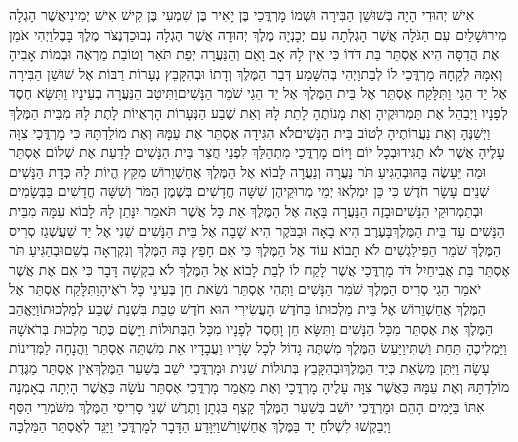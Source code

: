 \documentclass[../main/main.tex]{subfiles}
\begin{document}
\begin{multicols*}{\ncols}
אִישׁ יְהוּדִי הָיָה בְּשׁוּשַׁן הַבִּירָה וּשְׁמוֹ מָרְדֳּכַי בֶּן יָאִיר בֶּן שִׁמְעִי בֶּן קִישׁ אִישׁ יְמִינִי\PreVerseSpace{}אֲשֶׁר הָגְלָה מִירוּשָׁלַיִם עִם הַגֹּלָה אֲשֶׁר הָגְלְתָה עִם יְכָנְיָה מֶלֶךְ יְהוּדָה אֲשֶׁר הֶגְלָה נְבוּכַדְנֶצֹּר מֶלֶךְ בָּבֶל\PreVerseSpace{}וַיְהִי אֹמֵן אֶת הֲדַסָּה הִיא אֶסְתֵּר בַּת דֹּדוֹ כִּי אֵין לָהּ אָב וָאֵם וְהַנַּעֲרָה יְפַת תֹּאַר וְטוֹבַת מַרְאֶה וּבְמוֹת אָבִיהָ וְאִמָּהּ לְקָחָהּ מָרְדֳּכַי לוֹ לְבַת\PreVerseSpace{}וַיְהִי בְּהִשָּׁמַע דְּבַר הַמֶּלֶךְ וְדָתוֹ וּבְהִקָּבֵץ נְעָרוֹת רַבּוֹת אֶל שׁוּשַׁן הַבִּירָה אֶל יַד הֵגָי וַתִּלָּקַח אֶסְתֵּר אֶל בֵּית הַמֶּלֶךְ אֶל יַד הֵגַי שֹׁמֵר הַנָּשִׁים\PreVerseSpace{}וַתִּיטַב הַנַּעֲרָה בְעֵינָיו וַתִּשָּׂא חֶסֶד לְפָנָיו וַיְבַהֵל אֶת תַּמְרוּקֶיהָ וְאֶת מָנוֹתֶהָ לָתֵת לָהּ וְאֵת שֶׁבַע הַנְּעָרוֹת הָרְאֻיוֹת לָתֶת לָהּ מִבֵּית הַמֶּלֶךְ וַיְשַׁנֶּהָ וְאֶת נַעֲרוֹתֶיהָ לְטוֹב בֵּית הַנָּשִׁים\PreVerseSpace{}לֹא הִגִּידָה אֶסְתֵּר אֶת עַמָּהּ וְאֶת מוֹלַדְתָּהּ כִּי מָרְדֳּכַי צִוָּה עָלֶיהָ אֲשֶׁר לֹא תַגִּיד\PreVerseSpace{}וּבְכָל יוֹם וָיוֹם מָרְדֳּכַי מִתְהַלֵּךְ לִפְנֵי חֲצַר בֵּית הַנָּשִׁים לָדַעַת אֶת שְׁלוֹם אֶסְתֵּר וּמַה יֵּעָשֶׂה בָּהּ\PreVerseSpace{}וּבְהַגִּיעַ תֹּר נַעֲרָה וְנַעֲרָה לָבוֹא אֶל הַמֶּלֶךְ אֲחַשְׁוֵרוֹשׁ מִקֵּץ הֱיוֹת לָהּ כְּדָת הַנָּשִׁים שְׁנֵים עָשָׂר חֹדֶשׁ כִּי כֵּן יִמְלְאוּ יְמֵי מְרוּקֵיהֶן שִׁשָּׁה חֳדָשִׁים בְּשֶׁמֶן הַמֹּר וְשִׁשָּׁה חֳדָשִׁים בַּבְּשָׂמִים וּבְתַמְרוּקֵי הַנָּשִׁים\PreVerseSpace{}וּבָזֶה הַנַּעֲרָה בָּאָה אֶל הַמֶּלֶךְ אֵת כָּל אֲשֶׁר תֹּאמַר יִנָּתֵן לָהּ לָבוֹא עִמָּהּ מִבֵּית הַנָּשִׁים עַד בֵּית הַמֶּלֶךְ\PreVerseSpace{}בָּעֶרֶב הִיא בָאָה וּבַבֹּקֶר הִיא שָׁבָה אֶל בֵּית הַנָּשִׁים שֵׁנִי אֶל יַד שַׁעֲשְׁגַז סְרִיס הַמֶּלֶךְ שֹׁמֵר הַפִּילַגְשִׁים לֹא תָבוֹא עוֹד אֶל הַמֶּלֶךְ כִּי אִם חָפֵץ בָּהּ הַמֶּלֶךְ וְנִקְרְאָה בְשֵׁם\PreVerseSpace{}וּבְהַגִּיעַ תֹּר אֶסְתֵּר בַּת אֲבִיחַיִל דֹּד מָרְדֳּכַי אֲשֶׁר לָקַח לוֹ לְבַת לָבוֹא אֶל הַמֶּלֶךְ לֹא בִקְשָׁה דָּבָר כִּי אִם אֶת אֲשֶׁר יֹאמַר הֵגַי סְרִיס הַמֶּלֶךְ שֹׁמֵר הַנָּשִׁים וַתְּהִי אֶסְתֵּר נֹשֵׂאת חֵן בְּעֵינֵי כָּל רֹאֶיהָ\PreVerseSpace{}וַתִּלָּקַח אֶסְתֵּר אֶל הַמֶּלֶךְ אֲחַשְׁוֵרוֹשׁ אֶל בֵּית מַלְכוּתוֹ בַּחֹדֶשׁ הָעֲשִׂירִי הוּא חֹדֶשׁ טֵבֵת בִּשְׁנַת שֶׁבַע לְמַלְכוּתוֹ\PreVerseSpace{}וַיֶּאֱהַב הַמֶּלֶךְ אֶת אֶסְתֵּר מִכָּל הַנָּשִׁים וַתִּשָּׂא חֵן וָחֶסֶד לְפָנָיו מִכָּל הַבְּתוּלוֹת וַיָּשֶׂם כֶּתֶר מַלְכוּת בְּרֹאשָׁהּ וַיַּמְלִיכֶהָ תַּחַת וַשְׁתִּי\PreVerseSpace{}וַיַּעַשׂ הַמֶּלֶךְ מִשְׁתֶּה גָדוֹל לְכָל שָׂרָיו וַעֲבָדָיו אֵת מִשְׁתֵּה אֶסְתֵּר וַהֲנָחָה לַמְּדִינוֹת עָשָׂה וַיִּתֵּן מַשְׂאֵת כְּיַד הַמֶּלֶךְ\PreVerseSpace{}וּבְהִקָּבֵץ בְּתוּלוֹת שֵׁנִית וּמָרְדֳּכַי יֹשֵׁב בְּשַׁעַר הַמֶּלֶךְ\PreVerseSpace{}אֵין אֶסְתֵּר מַגֶּדֶת מוֹלַדְתָּהּ וְאֶת עַמָּהּ כַּאֲשֶׁר צִוָּה עָלֶיהָ מָרְדֳּכָי וְאֶת מַאֲמַר מָרְדֳּכַי אֶסְתֵּר עֹשָׂה כַּאֲשֶׁר הָיְתָה בְאָמְנָה אִתּוֹ \ClosedSection{}בַּיָּמִים הָהֵם וּמָרְדֳּכַי יוֹשֵׁב בְּשַׁעַר הַמֶּלֶךְ קָצַף בִּגְתָן וָתֶרֶשׁ שְׁנֵי סָרִיסֵי הַמֶּלֶךְ מִשֹּׁמְרֵי הַסַּף וַיְבַקְשׁוּ לִשְׁלֹחַ יָד בַּמֶּלֶךְ אֲחַשְׁוֵרֹשׁ\PreVerseSpace{}וַיִּוָּדַע הַדָּבָר לְמָרְדֳּכַי וַיַּגֵּד לְאֶסְתֵּר הַמַּלְכָּה 
\end{multicols*}
\end{document}

